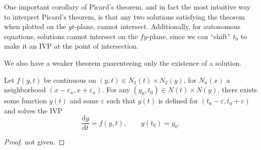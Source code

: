 One important corollary of Picard's theorem, and in fact the most intuitive way to interpret Picard's theorem, is that any two solutions satisfying the theorem when plotted on the $yt$-plane, cannot intersect. Additionally, for autonomous equations, solutions cannot intersect on the $fy$-plane, since we can ``shift'' $t_0$ to make it an IVP at the point of intersection.

We also have a weaker theorem guarenteeing only the existence of a solution.
\begin{theorem}\label{thm:3}
	Let $f(y,t)$ be continuous on $(y,t)\in N_1 (t)\times N_2 (y)$, for $N_n(x)$ a neighborhood $(x-\varepsilon_n ,x+\varepsilon_n )$. For any $(y_0,t_0)\in N(t)\times N(y)$, there exists some function $y(t)$ and some $\varepsilon $ such that $y(t)$ is defined for $\left( t_0-\varepsilon ,t_0+\varepsilon  \right) $ and solves the IVP
	\[
		\frac{\mathrm{d}y}{\mathrm{d}t} =f(y,t),\qquad y(t_0)=y_0
	.\]
\end{theorem}
\begin{proof}
	not given.
\end{proof}
